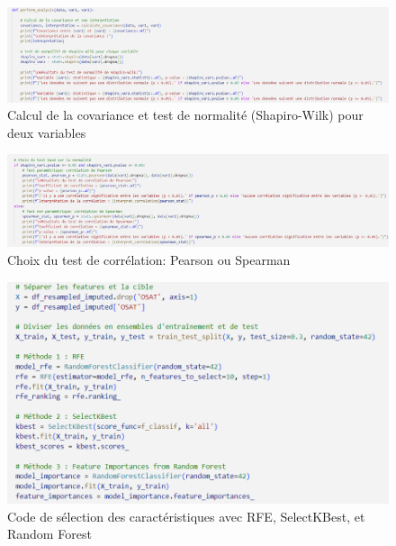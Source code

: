 \begin{figure}[H]
    \centering
    \includegraphics[width=0.8\linewidth]{capture_sas_28.png}
    \caption{Calcul de la covariance et test de normalité (Shapiro-Wilk) pour deux variables}
    \label{molka}
\end{figure}
\vspace{10pt}

\begin{figure}[H]
    \centering
    \includegraphics[width=0.8\linewidth]{capture_sas_29.png}
    \caption{Choix du test de corrélation: Pearson ou Spearman}
    \label{hamma}
\end{figure}
\vspace{10pt}

\begin{figure}[H]
    \centering
    \includegraphics[width=0.9\linewidth]{capture_sas_61.png}
    \caption{Code de sélection des caractéristiques avec RFE, SelectKBest, et Random Forest}
    \label{code_features_Selection}
\end{figure}
\vspace{10pt}

